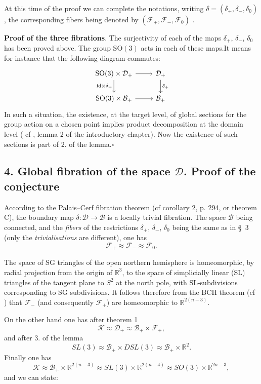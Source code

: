 \documentclass[12pt]{article}
\begin{document}
 
At this time of the proof we can complete the notations, writing $  \delta=(\delta_+, \delta_-, \delta_0)$,  the corresponding fibers being denoted by  $(\mathcal{F}_+, \mathcal{F}_-, \mathcal{F}_0)$ . 


\textbf{Proof of the three fibrations}. The surjectivity of each of the maps $\delta_+$, $\delta_-$, $\delta_0$ has been proved above. The group $\mathrm{SO}(3)$ acts in each of these maps.It means for instance that the following diagram commutes:
\[
\begin{tikzcd}
\mathrm{SO}(3) \times \mathcal{D}_+ \arrow[r] \arrow[d, "\mathrm{id} \times \delta_+"'] & \mathcal{D}_+ \arrow[d,"\delta_+"] \\
\mathrm{SO}(3) \times \mathcal{B}_+ \arrow[r] & \mathcal{B}_+
\end{tikzcd}
\]
 In such a situation, the existence, at the target level, of global sections for the group action on a chosen point implies product decomposition at the domain level ( cf \cite{cerf}, lemma 2 of the introductory chapter). Now the existence of such sections is part of 2. of the lemma.\quad$\square$



\subsection*{4. Global fibration of the space $\mathcal{D}$. Proof of the conjecture}

According to the Palais--Cerf fibration theorem (cf \cite{cerf} corollary 2, p. 294, or \cite{palais} theorem C), the boundary map $\delta : \mathcal{D} \to \mathcal{B}$ is a locally trivial fibration. The space $\mathcal{B}$ being connected, and the \emph{fibers} of the restrictions $\delta_+$, $\delta_-$, $\delta_0$ being the same as in \S~3 (only the \emph{trivialisations} are different), one has
\[
\mathcal{F}_+ \approx \mathcal{F}_- \approx \mathcal{F}_0.
\]

The space of SG triangles of the open northern hemisphere is homeomorphic, by radial projection from the origin of $\mathbb{R}^3$, to the space of simplicially linear (SL) triangles of the tangent plane to $S^2$ at the north pole, with SL-subdivisions corresponding to SG subdivisions. It follows therefore from the BCH theorem (cf \cite{bloch}) that $\mathcal{F}_-$ (and consequently $\mathcal{F}_+$) are homeomorphic to $\mathbb{R}^{2(n-3)}$.

On the other hand one has after theorem 1
\[
\mathcal{K} \approx \mathcal{D}_+ \approx \mathcal{B}_+ \times \mathcal{F}_+,
\]
and after 3. of the lemma
\[
SL(3) \approx \mathcal{B}_+ \times DSL(3) \approx \mathcal{B}_+ \times \mathbb{R}^2.
\]
Finally one has
\[
\mathcal{K} \approx \mathcal{B}_+ \times \mathbb{R}^{2(n-3)} \approx SL(3) \times \mathbb{R}^{2(n-4)} \approx SO(3) \times \mathbb{R}^{2n-3},
\]
and we can state:
\end{document}
